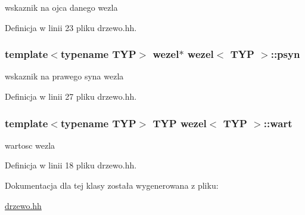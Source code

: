 wskaznik na ojca danego wezla 



Definicja w linii 23 pliku drzewo.\-hh.

\hypertarget{classwezel_ad11efeb4a2370777c00dce1ad6cd6431}{
\subsubsection[{psyn}]{\setlength{\rightskip}{0pt plus 5cm}template$<$typename T\-Y\-P$>$ {\bf wezel}$\ast$ {\bf wezel}$<$ T\-Y\-P $>$\-::psyn}}\label{classwezel_ad11efeb4a2370777c00dce1ad6cd6431}


wskaznik na prawego syna wezla 



Definicja w linii 27 pliku drzewo.\-hh.

\hypertarget{classwezel_a40046e679b18d040aaaacd2beccf7fed}{
\subsubsection[{wart}]{\setlength{\rightskip}{0pt plus 5cm}template$<$typename T\-Y\-P$>$ T\-Y\-P {\bf wezel}$<$ T\-Y\-P $>$\-::wart\hspace{0.3cm}{\ttfamily [private]}}}\label{classwezel_a40046e679b18d040aaaacd2beccf7fed}


wartosc wezla 



Definicja w linii 18 pliku drzewo.\-hh.



Dokumentacja dla tej klasy została wygenerowana z pliku\-:\begin{DoxyCompactItemize}
\item 
\hyperlink{drzewo_8hh}{drzewo.\-hh}\end{DoxyCompactItemize}
